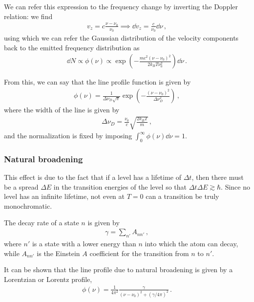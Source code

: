 \documentclass[main.tex]{subfiles}
\begin{document}
We can refer this expression to the frequency change by inverting the Doppler relation: we find 
%
\begin{align}
v_z = c \frac{\nu - \nu_0 }{\nu_0 }
\implies 
\dd{v_z} = \frac{c}{\nu_0 } \dd{\nu }
\,,
\end{align}
%
using which we can refer the Gaussian distribution of the velocity components back to the emitted frequency distribution as 
%
\begin{align}
\dd{N} \propto \phi (\nu ) \propto \exp(- \frac{m c^2 (\nu - \nu_0 )^2}{2 k_B T \nu_0^2}) \dd{\nu }
\,.
\end{align}

From this, we can say that the line profile function is given by 
%
\begin{align}
\phi (\nu ) = \frac{1}{ \Delta \nu _D \sqrt{\pi }} \exp(- \frac{(\nu - \nu_0 )^2}{\Delta \nu_D^2})
\,,
\end{align}
%
where the width of the line is given by
%
\begin{align}
\Delta \nu _D = \frac{\nu_0 }{c} \sqrt{\frac{2 k_B T}{m}}
\,,
\end{align}
%
and the normalization is fixed by imposing \(\int_0^{\infty  } \phi (\nu ) \dd{\nu } = 1\).  

\subsubsection{Natural broadening}

This effect is due to the fact that if a level has a lifetime of \(\Delta t\), then there must be a spread \(\Delta E\) in the transition energies of the level so that \(\Delta t \Delta E \gtrsim \hbar\). 
Since no level has an infinite lifetime, not even at \(T =0 \) can a transition be truly monochromatic. 

The decay rate of a state \(n\) is given by 
%
\begin{align}
\gamma = \sum _{n'} A _{n n'}
\,,
\end{align}
%
where \(n'\) is a state with a lower energy than \(n\) into which the atom can decay, while \(A_{nn'}\) is the Einstein \(A\) coefficient for the transition from \(n\) to \(n'\). 

It can be shown that the line profile due to natural broadening is given by a Lorentzian or Lorentz profile, 
%
\begin{align}
\phi (\nu ) = \frac{1}{4 \pi^2} \frac{\gamma }{(\nu - \nu_0 )^2 + (\gamma / 4 \pi )^2}
\,.
\end{align}
\end{document}
